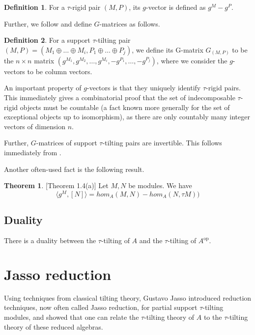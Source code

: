 \documentclass[]{article}
\theoremstyle{definition}
\newtheorem{definition}{Definition}[section]
\newtheorem{theorem}{Theorem}[section]
\newcommand{\tu}{\ensuremath{\tau}}
\begin{document}
\begin{definition}
	For a $\tau$-rigid pair $(M,P)$, its $g$-vector is defined as $g^M - g^P$. 
\end{definition}

Further, we follow \cite{schroll2020tautilting} and define $G$-matrices as follows.

\begin{definition}\cite[Definition 2.4]{schroll2020tautilting}
	For a support \tu-tilting pair $(M,P) = (M_1 \oplus \dots \oplus M_i,P_1 \oplus \dots \oplus P_j)$, we define its G-matrix $G_{(M,P)}$ to be the $n \times n$ matrix $(g^{M_1},g^{M_2},\dots,g^{M_i},-g^{P_1},\dots,-g^{P_j})$, where we consider the $g$-vectors to be column vectors.
	
\end{definition} 

An important property of $g$-vectors is that they uniquely identify $\tau$-rigid pairs\cite[Theorem 5.5]{tau}. This immediately gives a combinatorial proof that the set of indecomposable \tu-rigid objects must be countable (a fact known more generally for the set of exceptional objects up to isomorphism), as there are only countably many integer vectors of dimension $n$. 

Further, $G$-matrices of support \tu-tilting pairs are invertible. This follows immediately from \cite[Theorem 5.1]{tau}.

Another often-used fact is the following result.

\begin{theorem}\cite{auslander1985modules}[Theorem 1.4(a)]
	Let $M,N$ be modules. We have \[\langle g^M,[N]\rangle = hom_A(M,N) - hom_A(N,\tau M))\]
\end{theorem}


\subsection{Duality}
There is a duality between the \tu-tilting of $A$ and the \tu-tilting of $A^\text{op}$.

\section{Jasso reduction}
Using techniques from classical tilting theory, Gustavo Jasso\cite{jassoreduction} introduced reduction techniques, now often called Jasso reduction, for partial support \tu-tilting modules, and showed that one can relate the \tu-tilting theory of $A$ to the \tu-tilting theory of these reduced algebras.
\end{document}
